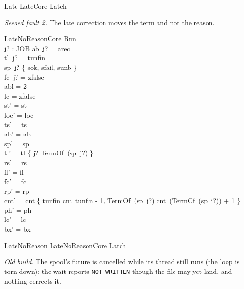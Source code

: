 \documentclass[a4paper,10pt,fleqn]{article}
\newcommand{\field}[1]{\texttt{#1}}
\begin{document}
\begin{zed}
Late  LateCore \land Latch
\end{zed}

\emph{Seeded fault 2.} The late correction moves the term and not the reason.

\begin{schema}{LateNoReasonCore}
\Delta Run \\ j? : JOB
\where
ab~j? = arec \\
tl~j? = tunfin \\
sp~j? \in \{ sok, sfail, sunb \} \\
fc~j? = zfalse \\
abl = 2 \\
lc = zfalse \\
st' = st \\
loc' = loc \\
ts' = ts \\
ab' = ab \\
sp' = sp \\
tl' = tl \oplus \{ j? \mapsto TermOf~(sp~j?) \} \\
rs' = rs \\
fl' = fl \\
fc' = fc \\
rp' = rp \\
cnt' = cnt \oplus \{ tunfin \mapsto cnt~tunfin - 1, TermOf~(sp~j?) \mapsto cnt~(TermOf~(sp~j?)) + 1 \} \\
ph' = ph \\
lc' = lc \\
bx' = bx
\end{schema}

\begin{zed}
LateNoReason  LateNoReasonCore \land Latch
\end{zed}

\emph{Old build.} The spool's future is cancelled while its thread still runs
(the loop is torn down): the wait reports \field{NOT\_WRITTEN} though the file may
yet land, and nothing corrects it.
\end{document}
